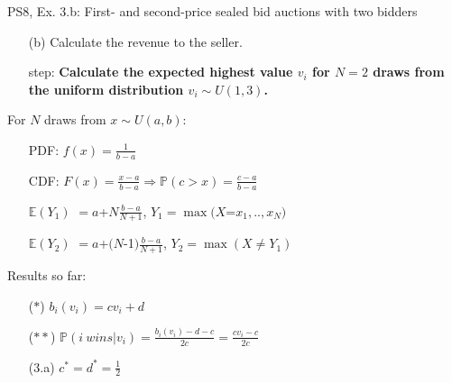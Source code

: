 \begin{frame}{PS8, Ex. 3.b: First- and second-price sealed bid auctions with two bidders}
    \begin{multicols}{2}
      \begin{itemize}
        \item[(b)] Calculate the revenue to the seller.
        \item[\nth{1} step:] \textbf{Calculate the expected highest value $v_i$ for $N=2$ draws from the uniform distribution $v_i\sim U(1,3)$.}
      \end{itemize}
      \vfill\null\columnbreak
      For $N$ draws from $x\sim U(a, b):$
      \vspace{-6pt}
      \begin{enumerate}
        \item[PDF:] $f(x)=\frac{1}{b-a}$
        \item[CDF:] $F(x)=\frac{x-a}{b-a}\Rightarrow\mathbb{P}(c>x)=\frac{c-a}{b-a}$
        \item[$\mathbb{E}(Y_1)$] $=a$+$N\frac{b-a}{N+1}$, $Y_1=\max(X$=$x_1,..,x_N)$
        \item[$\mathbb{E}(Y_2)$] $=a$+$(N$-1$)\frac{b-a}{N+1}$, $Y_2=\max(X\neq Y_1)$
      \end{enumerate}
      \vspace{-6pt}
      Results so far:
      \vspace{-6pt}
      \begin{itemize}
        \item[($*$)]  $b_i(v_i) = cv_i+d$
        \item[($**$)] $\mathbb{P}(i\ wins|v_i)=\frac{b_i(v_i)-d-c}{2c}=\frac{cv_i-c}{2c}$
        \item[(3.a)]    $c^*=d^*=\frac{1}{2}$
      \end{itemize}
      \vfill\null
    \end{multicols}
\end{frame}

